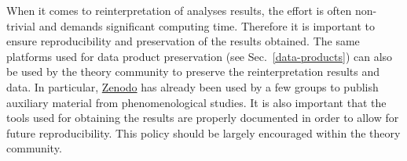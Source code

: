 \documentclass[11pt]{article}
\begin{document}


When it comes to reinterpretation of analyses results, the effort is often non-trivial and demands significant computing time. Therefore it is important to ensure reproducibility and  preservation of the results obtained.
The same platforms used for data product preservation (see Sec.~\ref{data-products}) can also be used by the theory community to preserve the reinterpretation results and data.
In particular, \href{https://zenodo.org/}{Zenodo} has already been used by a few groups to publish auxiliary material from phenomenological studies.
It is also important that the tools used for obtaining the results are properly documented in order to allow for future reproducibility.
This policy should be largely encouraged within the theory community.
\end{document}
